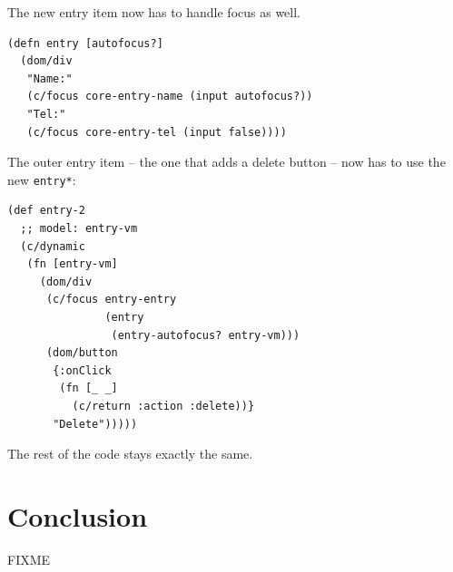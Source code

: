 \documentclass[sigplan,screen]{acmart}
\begin{document}
%
The new entry item now has to handle focus as well.
%
\begin{verbatim}
(defn entry [autofocus?]
  (dom/div
   "Name:"
   (c/focus core-entry-name (input autofocus?))
   "Tel:"
   (c/focus core-entry-tel (input false))))
\end{verbatim}
%
The outer entry item -- the one that adds a delete button -- now has to use the new \texttt{entry*}:
%
\begin{verbatim}
(def entry-2
  ;; model: entry-vm
  (c/dynamic
   (fn [entry-vm]
     (dom/div
      (c/focus entry-entry
               (entry
                (entry-autofocus? entry-vm)))
      (dom/button
       {:onClick
        (fn [_ _]
          (c/return :action :delete))}
       "Delete")))))
\end{verbatim}
%
The rest of the code stays exactly the same.


\section{Conclusion}
\label{sec:conclusion}

FIXME



\end{document}
